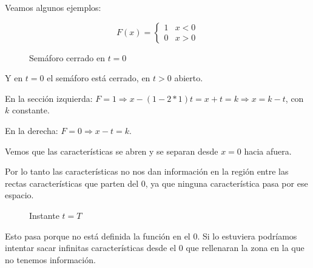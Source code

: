 		\begin{figure}[!htb]
			\centering
			\caption{}
			\label{fig:rectasDivergentes}
		\end{figure}

		\newpage

		Veamos algunos ejemplos:

		\begin{example}[Semáforo]

			$$F(x) =
			\begin{cases}
				1 & x < 0 \\
				0 & x > 0
			\end{cases}
			$$

			\begin{figure}[!htb]
				\centering
				\caption{Semáforo cerrado en $t=0$}
				\label{fig:semaforoCerrado}
			\end{figure}

			Y en $t=0$ el semáforo está cerrado, en $t>0$ abierto.

			En la sección izquierda: $ F = 1 \Rightarrow x - (1 - 2*1)t = x + t = k \Rightarrow x = k -t $, con $k$ constante.

			En la derecha: $F = 0 \Rightarrow x-t = k$.

			\begin{figure}[!htb]
				\centering
				\caption{}
				\label{fig:caracteristicasSemaforo}
			\end{figure}

			Vemos que las características se abren y se separan desde $x=0$ hacia afuera.

			Por lo tanto las características no nos dan información en la región entre las rectas características que parten del $0$, ya que ninguna característica pasa por ese espacio.

			\begin{figure}[!htb]
				\centering
				\caption{Instante $t=T$}
				\label{fig:semaforoT}
			\end{figure}

			Esto pasa porque no está definida la función en el $0$. Si lo estuviera podríamos intentar sacar infinitas características desde el 0 que rellenaran la zona en la que no tenemos información.

		\end{example}

